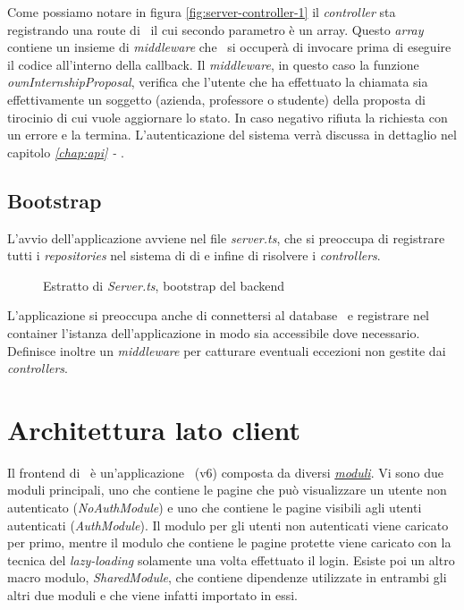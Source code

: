 \noindent
Come possiamo notare in figura \ref{fig:server-controller-1} il \textit{controller} sta registrando una route di \expressjs~il cui  secondo parametro è un array. Questo \textit{array} contiene un insieme di \textit{middleware} che \expressjs~si occuperà di invocare prima di eseguire il codice all'interno della \gls{callback}. Il \textit{middleware}, in questo caso la funzione \textit{ownInternshipProposal}, verifica che l'utente che ha effettuato la chiamata sia effettivamente un soggetto (azienda, professore o studente) della proposta di tirocinio di cui vuole aggiornare lo stato. In caso negativo rifiuta la richiesta con un errore e la termina. L'autenticazione del sistema verrà discussa in dettaglio nel capitolo \textit{\ref{chap:api} - }.

\pagebreak
\subsection{Bootstrap}

L'avvio dell'applicazione avviene nel file \textit{server.ts}, che si preoccupa di registrare tutti i \textit{repositories} nel sistema di \acrlong{di} e infine di risolvere i \textit{controllers}.
\begin{figure}[H] 
	\centering    
	
	\caption[Estratto di \textit{Server.ts}, bootstrap del \gls{backend}]{Estratto di \textit{Server.ts}, bootstrap del \gls{backend}}
	\label{fig:server-bootstrap}
\end{figure}

\noindent
L'applicazione si preoccupa anche di connettersi al database \mongodb~e registrare nel container l'istanza dell'applicazione in modo sia accessibile dove necessario. Definisce inoltre un \textit{middleware} per catturare eventuali eccezioni non gestite dai \textit{controllers}.

\pagebreak
\section{Architettura lato client}

Il \gls{frontend} di \projectName~è un'applicazione \angular~(v6) composta da diversi \hyperref[chap:ngmodules]{\textit{moduli}}. Vi sono due moduli principali, uno che contiene le pagine che può visualizzare un utente non autenticato (\textit{NoAuthModule}) e uno che contiene le pagine visibili agli utenti autenticati (\textit{AuthModule}). Il modulo per gli utenti non autenticati viene caricato per primo, mentre il modulo che contiene le pagine protette viene caricato con la tecnica del \textit{lazy-loading} solamente una volta effettuato il login. Esiste poi un altro macro modulo, \textit{SharedModule}, che contiene dipendenze utilizzate in entrambi gli altri due moduli e che viene infatti importato in essi.

